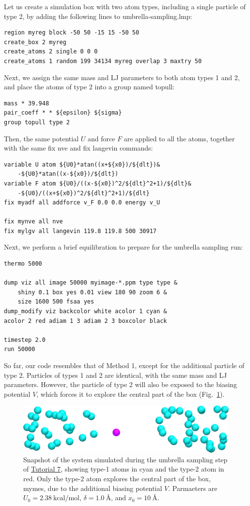 \documentclass[9pt,tutorial]{livecoms}
\newcommand{\lmpcmd}[1]{\hspace{0pt}\colorbox{listing}{\textcolor{command}{\small{#1}}}\hspace{0pt}} %
\begin{document}
Let us create a simulation box with two atom types, including a single particle of type 2,
by adding the following lines to \lmpcmd{umbrella-sampling.lmp}:
\begin{lstlisting}
region myreg block -50 50 -15 15 -50 50
create_box 2 myreg
create_atoms 2 single 0 0 0
create_atoms 1 random 199 34134 myreg overlap 3 maxtry 50
\end{lstlisting}
Next, we assign the same mass and LJ parameters to both atom types
1 and 2, and place the atoms of type 2 into a group named \lmpcmd{topull}:
\begin{lstlisting}
mass * 39.948
pair_coeff * * ${epsilon} ${sigma}
group topull type 2
\end{lstlisting}
Then, the same potential $U$ and force $F$ are applied to all the atoms,
together with the same \lmpcmd{fix nve} and \lmpcmd{fix langevin} commands:
\begin{lstlisting}
variable U atom ${U0}*atan((x+${x0})/${dlt})&
    -${U0}*atan((x-${x0})/${dlt})
variable F atom ${U0}/((x-${x0})^2/${dlt}^2+1)/${dlt}&
    -${U0}/((x+${x0})^2/${dlt}^2+1)/${dlt}
fix myadf all addforce v_F 0.0 0.0 energy v_U

fix mynve all nve
fix mylgv all langevin 119.8 119.8 500 30917
\end{lstlisting}
Next, we perform a brief equilibration to prepare for the
umbrella sampling run:
\begin{lstlisting}
thermo 5000

dump viz all image 50000 myimage-*.ppm type type &
    shiny 0.1 box yes 0.01 view 180 90 zoom 6 &
    size 1600 500 fsaa yes
dump_modify viz backcolor white acolor 1 cyan &
acolor 2 red adiam 1 3 adiam 2 3 boxcolor black

timestep 2.0
run 50000
\end{lstlisting}

So far, our code resembles that of Method 1, except for the additional particle
of type 2.  Particles of types 1 and 2 are identical, with the same mass
and LJ parameters.  However, the particle of type 2 will also
be exposed to the biasing potential $V$, which forces it to explore the
central part of the box (Fig.~\ref{fig:US-system-biased}).

\begin{figure}
\centering
\includegraphics[width=\linewidth]{US-system-biased}
\caption{Snapshot of the system simulated during the umbrella sampling
step of \hyperref[umbrella-sampling-label]{Tutorial 7}, showing type-1 atoms
in cyan and the type-2 atom in red.  Only the type-2 atom explores the central part of the box,
\lmpcmd{mymes}, due to the additional biasing potential $V$. Parmaeters are
$U_0 = 2.38~\text{kcal/mol}$, $\delta = 1.0~\text{\AA{}}$, and $x_0 = 10~\text{\AA{}}$.}
\label{fig:US-system-biased}
\end{figure}
\end{document}
